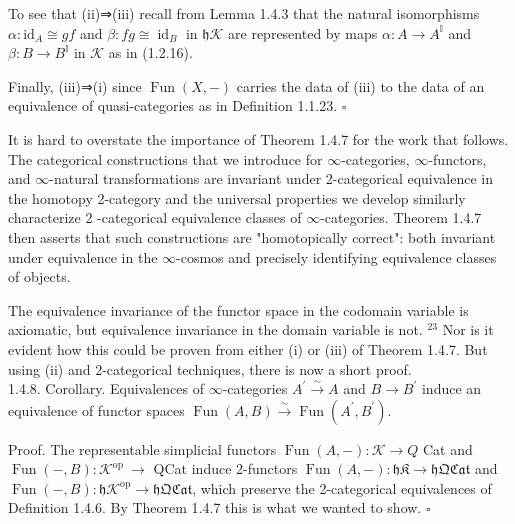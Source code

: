 \documentclass[10pt]{article}
\begin{document}
To see that (ii)⇒(iii) recall from Lemma 1.4.3 that the natural isomorphisms $\alpha: \mathrm{id}_{A} \cong g f$ and $\beta: f g \cong \operatorname{id}_{B}$ in $\mathfrak{h} \mathcal{K}$ are represented by maps $\alpha: A \rightarrow A^{\mathbb{I}}$ and $\beta: B \rightarrow B^{\mathbb{I}}$ in $\mathcal{K}$ as in (1.2.16).

Finally, (iii)⇒(i) since $\operatorname{Fun}(X,-)$ carries the data of (iii) to the data of an equivalence of quasi-categories as in Definition 1.1.23. \(\square\)

It is hard to overstate the importance of Theorem 1.4.7 for the work that follows. The categorical constructions that we introduce for $\infty$-categories, $\infty$-functors, and $\infty$-natural transformations are invariant under 2-categorical equivalence in the homotopy 2-category and the universal properties we develop similarly characterize 2 -categorical equivalence classes of $\infty$-categories. Theorem 1.4.7 then asserts that such constructions are "homotopically correct": both invariant under equivalence in the $\infty$-cosmos and precisely identifying equivalence classes of objects.

The equivalence invariance of the functor space in the codomain variable is axiomatic, but equivalence invariance in the domain variable is not. ${ }^{23}$ Nor is it evident how this could be proven from either (i) or (iii) of Theorem 1.4.7. But using (ii) and 2-categorical techniques, there is now a short proof.\\
1.4.8. Corollary. Equivalences of $\infty$-categories $A^{\prime} \xrightarrow{\sim} A$ and $B \xrightarrow{ } B^{\prime}$ induce an equivalence of functor spaces $\operatorname{Fun}(A, B) \xrightarrow{\sim} \operatorname{Fun}\left(A^{\prime}, B^{\prime}\right)$.

Proof. The representable simplicial functors $\operatorname{Fun}(A,-): \mathcal{K} \rightarrow Q$ Cat and $\operatorname{Fun}(-, B): \mathcal{K}^{\text {op }} \rightarrow$ QCat induce 2-functors $\operatorname{Fun}(A,-): \mathfrak{h K} \rightarrow \mathfrak{h Q C a t}$ and $\operatorname{Fun}(-, B): \mathfrak{h} \mathcal{K}^{\mathrm{op}} \rightarrow \mathfrak{h Q C a t}$, which preserve the 2-categorical equivalences of Definition 1.4.6. By Theorem 1.4.7 this is what we wanted to show. \(\square\)
\end{document}
